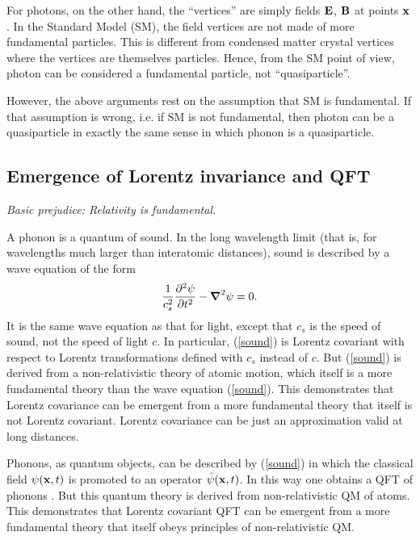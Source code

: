 \documentclass[12pt]{article}
\begin{document}
For photons, on the other hand, the ``vertices'' are simply fields ${\bf E}$, ${\bf B}$ at points ${\bf x}$. 
In the Standard Model (SM), the field vertices are not made of more fundamental particles.
This is different from condensed matter crystal vertices where the vertices are themselves particles. 
Hence, from the SM point of view, photon can be considered 
a fundamental particle, not ``quasiparticle''. 

However, the above arguments rest on the assumption that SM is fundamental.
If that assumption is wrong, i.e. if SM is not fundamental, then photon can be a quasiparticle
in exactly the same sense in which phonon is a quasiparticle.


\subsection{Emergence of Lorentz invariance and QFT}

\begin{flushright}
{\it Basic prejudice: Relativity is fundamental.} 
\end{flushright}

A phonon is a quantum of sound. In the long wavelength limit (that is, for wavelengths much larger than interatomic distances),
sound is described by a wave equation of the form
\begin{equation}\label{sound}
 \frac{1}{c_s^2} \frac{\partial^2\psi}{\partial t^2} - \mbox{\boldmath $\nabla$}^2 \psi =0 .
\end{equation}
It is the same wave equation as that for light, except that $c_s$ is the speed of sound, not the speed of light $c$.
In particular, (\ref{sound}) is Lorentz covariant with respect to Lorentz transformations defined with $c_s$ instead of $c$.
But (\ref{sound}) is derived from a non-relativistic theory of atomic motion, which itself is a more fundamental theory 
than the wave equation (\ref{sound}). This demonstrates that Lorentz covariance can be emergent from a more fundamental theory 
that itself is not Lorentz covariant. Lorentz covariance can be just an approximation valid at long distances.

Phonons, as quantum objects, can be described by (\ref{sound}) in which the classical field $\psi({\bf x},t)$
is promoted to an operator $\hat{\psi}({\bf x},t)$. In this way one obtains a QFT of phonons \cite{simons}. But this 
quantum theory is derived from non-relativistic QM of atoms. This demonstrates that Lorentz covariant QFT 
can be emergent from a more fundamental theory that itself obeys principles of non-relativistic QM.
\end{document}

